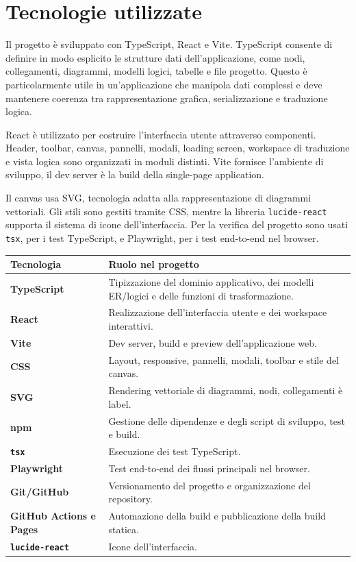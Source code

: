 \documentclass{unipd-thesis-modern}
\begin{document}
\chapter{Tecnologie utilizzate}

Il progetto è sviluppato con TypeScript, React e Vite. TypeScript consente di definire in modo esplicito le strutture dati dell'applicazione, come nodi, collegamenti, diagrammi, modelli logici, tabelle e file progetto. Questo è particolarmente utile in un'applicazione che manipola dati complessi e deve mantenere coerenza tra rappresentazione grafica, serializzazione e traduzione logica.

React è utilizzato per costruire l'interfaccia utente attraverso componenti. Header, toolbar, canvas, pannelli, modali, loading screen, workspace di traduzione e vista logica sono organizzati in moduli distinti. Vite fornisce l'ambiente di sviluppo, il dev server è la build della single-page application.

Il canvas usa SVG, tecnologia adatta alla rappresentazione di diagrammi vettoriali. Gli stili sono gestiti tramite CSS, mentre la libreria \texttt{lucide-react} supporta il sistema di icone dell'interfaccia. Per la verifica del progetto sono usati \texttt{tsx}, per i test TypeScript, e Playwright, per i test end-to-end nel browser.

\begin{table}[htbp]
\centering
\small
\begin{tabularx}{\textwidth}{>{\bfseries}p{3.2cm}X}
\toprule
Tecnologia & Ruolo nel progetto \\
\midrule
TypeScript & Tipizzazione del dominio applicativo, dei modelli ER/logici e delle funzioni di trasformazione. \\
React & Realizzazione dell'interfaccia utente e dei workspace interattivi. \\
Vite & Dev server, build e preview dell'applicazione web. \\
CSS & Layout, responsive, pannelli, modali, toolbar e stile del canvas. \\
SVG & Rendering vettoriale di diagrammi, nodi, collegamenti è label. \\
npm & Gestione delle dipendenze e degli script di sviluppo, test e build. \\
\texttt{tsx} & Esecuzione dei test TypeScript. \\
Playwright & Test end-to-end dei flussi principali nel browser. \\
Git/GitHub & Versionamento del progetto e organizzazione del repository. \\
GitHub Actions e Pages & Automazione della build e pubblicazione della build statica. \\
\texttt{lucide-react} & Icone dell'interfaccia. \\
\bottomrule
\end{tabularx}
\end{table}
\end{document}
